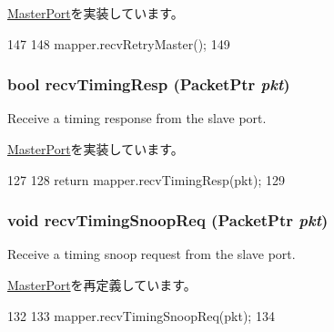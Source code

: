 \hyperlink{classMasterPort_ac1ccc3bcf7ebabb20b57fab99b2be5b0}{MasterPort}を実装しています。


\begin{DoxyCode}
147         {
148             mapper.recvRetryMaster();
149         }
\end{DoxyCode}
\hypertarget{classAddrMapper_1_1MapperMasterPort_a482dba5588f4bee43e498875a61e5e0b}{
\subsubsection[{recvTimingResp}]{\setlength{\rightskip}{0pt plus 5cm}bool recvTimingResp ({\bf PacketPtr} {\em pkt})}}
\label{classAddrMapper_1_1MapperMasterPort_a482dba5588f4bee43e498875a61e5e0b}
Receive a timing response from the slave port. 

\hyperlink{classMasterPort_abd323548d6c93f8b0543f1fe3a86ca35}{MasterPort}を実装しています。


\begin{DoxyCode}
127         {
128             return mapper.recvTimingResp(pkt);
129         }
\end{DoxyCode}
\hypertarget{classAddrMapper_1_1MapperMasterPort_aff3031c56fc4947a19695c868bb8233e}{
\subsubsection[{recvTimingSnoopReq}]{\setlength{\rightskip}{0pt plus 5cm}void recvTimingSnoopReq ({\bf PacketPtr} {\em pkt})}}
\label{classAddrMapper_1_1MapperMasterPort_aff3031c56fc4947a19695c868bb8233e}
Receive a timing snoop request from the slave port. 

\hyperlink{classMasterPort_ae43c73eff109f907118829fcfa9e7096}{MasterPort}を再定義しています。


\begin{DoxyCode}
132         {
133             mapper.recvTimingSnoopReq(pkt);
134         }
\end{DoxyCode}


